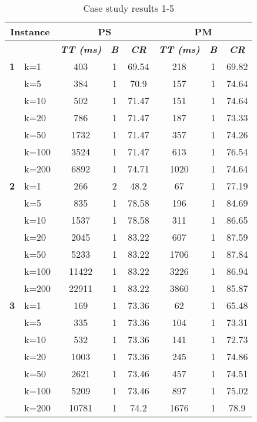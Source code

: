     \begin{table}[htbp]
    \caption{Case study results 1-5}
    \centering
    \begin{tabular}{|l|l|c|c|c|c|c|c|}
    \hline
    \multicolumn{ 2}{|c|}{\textbf{Instance}} & \multicolumn{ 3}{c|}{\textbf{PS}} & \multicolumn{ 3}{c|}{\textbf{PM}} \\ \hline
    \multicolumn{ 2}{|l|}{} & \textbf{\textit{TT (ms)}} & \textbf{\textit{B}} & \textbf{\textit{CR}} & \textbf{\textit{TT (ms)}} & \textbf{\textit{B}} & \textbf{\textit{CR}} \\ \hline
    \multicolumn{1}{|r|}{\textbf{1}} & k=1 & 403 & 1 & 69.54 & 218 & 1 & 69.82 \\ 
     & k=5 & 384 & 1 & 70.9 & 157 & 1 & 74.64 \\ 
     & k=10 & 502 & 1 & 71.47 & 151 & 1 & 74.64 \\ 
     & k=20 & 786 & 1 & 71.47 & 187 & 1 & 73.33 \\ 
     & k=50 & 1732 & 1 & 71.47 & 357 & 1 & 74.26 \\ 
     & k=100 & 3524 & 1 & 71.47 & 613 & 1 & 76.54 \\ 
     & k=200 & 6892 & 1 & 74.71 & 1020 & 1 & 74.64 \\ \hline
    \multicolumn{1}{|r|}{\textbf{2}} & k=1 & 266 & 2 & 48.2 & 67 & 1 & 77.19 \\ 
     & k=5 & 835 & 1 & 78.58 & 196 & 1 & 84.69 \\ 
     & k=10 & 1537 & 1 & 78.58 & 311 & 1 & 86.65 \\ 
     & k=20 & 2045 & 1 & 83.22 & 607 & 1 & 87.59 \\ 
     & k=50 & 5233 & 1 & 83.22 & 1706 & 1 & 87.84 \\ 
     & k=100 & 11422 & 1 & 83.22 & 3226 & 1 & 86.94 \\ 
     & k=200 & 22911 & 1 & 83.22 & 3860 & 1 & 85.87 \\ \hline
    \multicolumn{1}{|r|}{\textbf{3}} & k=1 & 169 & 1 & 73.36 & 62 & 1 & 65.48 \\ 
     & k=5 & 335 & 1 & 73.36 & 104 & 1 & 73.31 \\ 
     & k=10 & 532 & 1 & 73.36 & 141 & 1 & 72.73 \\ 
     & k=20 & 1003 & 1 & 73.36 & 245 & 1 & 74.86 \\ 
     & k=50 & 2621 & 1 & 73.46 & 457 & 1 & 74.51 \\ 
     & k=100 & 5209 & 1 & 73.46 & 897 & 1 & 75.02 \\ 
     & k=200 & 10781 & 1 & 74.2 & 1676 & 1 & 78.9 \\ \hline

\end{tabular}
\end{table}
